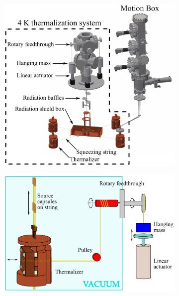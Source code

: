 \begin{figure}[htbp]
\centering
\begin{subfigure}[t]{0.44\textwidth}
\centering
\includegraphics[width=\textwidth]{Figures/thermalization_system_labeled.pdf}
\caption{}
\label{fig:4K_thermalizer_system}
\end{subfigure}
\qquad
\begin{subfigure}[t]{0.44\textwidth}
\centering
\includegraphics[width=\textwidth]{Figures/Thermalizer_schematic_labeled.pdf}
\caption{}
\label{fig:4K_thermalizer_schematic}
\end{subfigure}

\end{figure}
